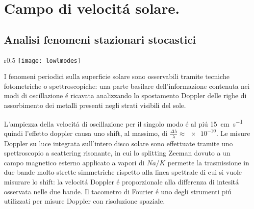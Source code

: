 \documentclass[../main.tex]{subfiles}
\begin{document}


{\let\clearpage\relax\let\cleardoublepage\relax
\chapter{Campo di velocit\'a solare.}
}

\section{Analisi fenomeni stazionari stocastici}


\begin{wrapfigure}[16]{r}{0.5\textwidth}
\centering
\texttt{[image: lowlmodes]}
\caption{Densit\'a spettrale modi p di basso grado angolare. Da \cite{chr02helioseismology}.}\label{fig:lowlmodes}
\end{wrapfigure}

I fenomeni periodici sulla superficie solare sono osservabili tramite tecniche fotometriche o spettroscopiche: una parte basilare dell'informazione contenuta nei modi di oscillazione \'e ricavata analizzando  lo spostamento Doppler delle righe di assorbimento dei metalli presenti negli strati visibili del sole.

L'ampiezza della velocit\'a di oscillazione per il singolo modo \'e  al pi\'u \SI{15}{\cm\per\second} quindi l'effetto doppler causa uno shift, al massimo, di $\frac{\Delta\lambda}{\lambda}\approx\num{e-10}$. Le misure Doppler su luce integrata sull'intero disco solare sono effettuate tramite uno spettroscopio a scattering risonante, in cui lo splitting  Zeeman dovuto a un campo magnetico esterno applicato a vapori di $Na/K$ permette la trasmissione  in due bande molto strette simmetriche rispetto alla linea spettrale di cui si vuole misurare lo shift: la velocit\'a Doppler \'e proporzionale alla differenza di intesit\'a osservata nelle due bande. Il tacometro di Fourier \'e uno degli strumenti pi\'u utilizzati per misure Doppler  con risoluzione spaziale.

\begin{workout}

\end{workout}
\end{document}
